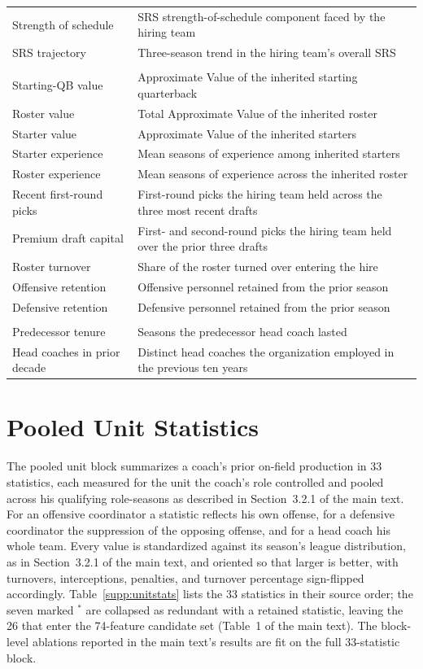 \documentclass[12pt,USenglish]{article}
\begin{document}
{\begin{longtable}{@{}l p{8.6cm}@{}}
Strength of schedule & SRS strength-of-schedule component faced by the hiring team \\
SRS trajectory & Three-season trend in the hiring team's overall SRS \\
\addlinespace
\multicolumn{2}{@{}l}{\emph{Inherited roster (10)}}\\[2pt]
Starting-QB value & Approximate Value of the inherited starting quarterback \\
Roster value & Total Approximate Value of the inherited roster \\
Starter value & Approximate Value of the inherited starters \\
Starter experience & Mean seasons of experience among inherited starters \\
Roster experience & Mean seasons of experience across the inherited roster \\
Recent first-round picks & First-round picks the hiring team held across the three most recent drafts \\
Premium draft capital & First- and second-round picks the hiring team held over the prior three drafts \\
Roster turnover & Share of the roster turned over entering the hire \\
Offensive retention & Offensive personnel retained from the prior season \\
Defensive retention & Defensive personnel retained from the prior season \\
\addlinespace
\multicolumn{2}{@{}l}{\emph{Organizational instability (2)}}\\[2pt]
Predecessor tenure & Seasons the predecessor head coach lasted \\
Head coaches in prior decade & Distinct head coaches the organization employed in the previous ten years \\
\end{longtable}
}

\section{Pooled Unit Statistics}
\label{sec:supp_unitstats}

The pooled unit block summarizes a coach's prior on-field production in 33 statistics, each measured for the unit the coach's role controlled and pooled across his qualifying role-seasons as described in Section~3.2.1 of the main text. For an offensive coordinator a statistic reflects his own offense, for a defensive coordinator the suppression of the opposing offense, and for a head coach his whole team. Every value is standardized against its season's league distribution, as in Section~3.2.1 of the main text, and oriented so that larger is better, with turnovers, interceptions, penalties, and turnover percentage sign-flipped accordingly. Table~\ref{supp:unitstats} lists the 33 statistics in their source order; the seven marked $^{\ast}$ are collapsed as redundant with a retained statistic, leaving the 26 that enter the 74-feature candidate set (Table~1 of the main text). The block-level ablations reported in the main text's results are fit on the full 33-statistic block.
\end{document}
